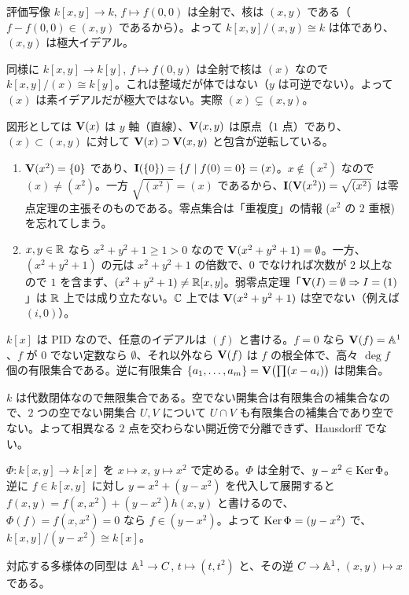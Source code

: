 評価写像 $k[x,y]\to k$, $f\mapsto f(0,0)$ は全射で、核は $(x,y)$ である（$f-f(0,0)\in(x,y)$ であるから）。よって $k[x,y]/(x,y)\cong k$ は体であり、$(x,y)$ は極大イデアル。

同様に $k[x,y]\to k[y]$, $f\mapsto f(0,y)$ は全射で核は $(x)$ なので $k[x,y]/(x)\cong k[y]$。これは整域だが体ではない（$y$ は可逆でない）。よって $(x)$ は素イデアルだが極大ではない。実際 $(x)\subsetneq(x,y)$。

図形としては $\mathbf{V}(x)$ は $y$ 軸（直線）、$\mathbf{V}(x,y)$ は原点（$1$ 点）であり、$(x)\subset(x,y)$ に対して $\mathbf{V}(x)\supset\mathbf{V}(x,y)$ と包含が逆転している。

\begin{enumerate}
  \item $\mathbf{V}(x^2)=\{0\}$ であり、$\mathbf{I}(\{0\})=\{f\mid f(0)=0\}=(x)$。$x\notin(x^2)$ なので $(x)\neq(x^2)$。一方 $\sqrt{(x^2)}=(x)$ であるから、$\mathbf{I}(\mathbf{V}(x^2))=\sqrt{(x^2)}$ は零点定理の主張そのものである。零点集合は「重複度」の情報 ($x^2$ の $2$ 重根) を忘れてしまう。
  \item $x,y\in\mathbb{R}$ なら $x^2+y^2+1\geq1>0$ なので $\mathbf{V}(x^2+y^2+1)=\emptyset$。一方、$(x^2+y^2+1)$ の元は $x^2+y^2+1$ の倍数で、$0$ でなければ次数が $2$ 以上なので $1$ を含まず、$(x^2+y^2+1)\neq\mathbb{R}[x,y]$。弱零点定理「$\mathbf{V}(I)=\emptyset\Rightarrow I=(1)$」は $\mathbb{R}$ 上では成り立たない。$\mathbb{C}$ 上では $\mathbf{V}(x^2+y^2+1)$ は空でない（例えば $(i,0)$）。
\end{enumerate}

$k[x]$ は PID なので、任意のイデアルは $(f)$ と書ける。$f=0$ なら $\mathbf{V}(f)=\mathbb{A}^1$、$f$ が $0$ でない定数なら $\emptyset$、それ以外なら $\mathbf{V}(f)$ は $f$ の根全体で、高々 $\deg f$ 個の有限集合である。逆に有限集合 $\{a_1,\dots,a_m\}=\mathbf{V}\bigl(\prod(x-a_i)\bigr)$ は閉集合。

$k$ は代数閉体なので無限集合である。空でない開集合は有限集合の補集合なので、$2$ つの空でない開集合 $U,V$ について $U\cap V$ も有限集合の補集合であり空でない。よって相異なる $2$ 点を交わらない開近傍で分離できず、Hausdorff でない。

$\Phi:k[x,y]\to k[x]$ を $x\mapsto x$, $y\mapsto x^2$ で定める。$\Phi$ は全射で、$y-x^2\in\operatorname{Ker}\Phi$。逆に $f\in k[x,y]$ に対し $y=x^2+(y-x^2)$ を代入して展開すると $f(x,y)=f(x,x^2)+(y-x^2)h(x,y)$ と書けるので、$\Phi(f)=f(x,x^2)=0$ なら $f\in(y-x^2)$。よって $\operatorname{Ker}\Phi=(y-x^2)$ で、$k[x,y]/(y-x^2)\cong k[x]$。

対応する多様体の同型は $\mathbb{A}^1\to C$, $t\mapsto(t,t^2)$ と、その逆 $C\to\mathbb{A}^1$, $(x,y)\mapsto x$ である。

